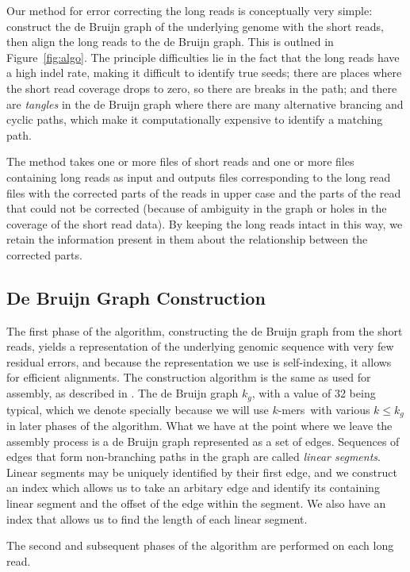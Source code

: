 \documentclass[twocolumn]{article}
\newcommand{\kmers}{$k$-mers}
\begin{document}
Our method for error correcting the long reads is conceptually very
simple: construct the de Bruijn graph of the underlying genome with
the short reads, then align the long reads to the de Bruijn graph.
This is outlned in Figure~\ref{fig:algo}.
The principle difficulties lie in the fact that the long reads have
a high indel rate, making it difficult to identify true seeds; there
are places where the short read coverage drops to zero, so there
are breaks in the path; and there are \textit{tangles} in the de
Bruijn graph where there are many alternative brancing and cyclic
paths, which make it computationally expensive to identify a matching path.

The method takes one or more files of short reads and one or more
files containing long reads as input and outputs files corresponding
to the long read files with the corrected parts of the reads in
upper case and the parts of the read that could not be corrected
(because of ambiguity in the graph or holes in the coverage of the
short read data).  By keeping the long reads intact in this way,
we retain the information present in them about the relationship
between the corrected parts.

\subsection{De Bruijn Graph Construction}
\label{sec:cons}

The first phase of the algorithm, constructing the de Bruijn graph from the short reads,
yields a representation of the underlying genomic sequence with very few residual errors,
and because the representation we use is self-indexing, it allows for efficient alignments.
The construction algorithm is the same as used for assembly, as described in \cite{goss2012}.
The de Bruijn graph $k_g$, with a value of 32 being typical, which we denote specially
because we will use \kmers\ with various $k \le k_g$ in later phases of the algorithm.
What we have at the point where we leave the assembly process is a de Bruijn graph
represented as a set of edges. Sequences of edges that form non-branching paths in
the graph are called \textit{linear segments}. Linear segments may be uniquely identified
by their first edge, and we construct an index which allows us to take an arbitary edge
and identify its containing linear segment and the offset of the edge within the segment.
We also have an index that allows us to find the length of each linear segment.

The second and subsequent phases of the algorithm are performed on each long read.
\end{document}
